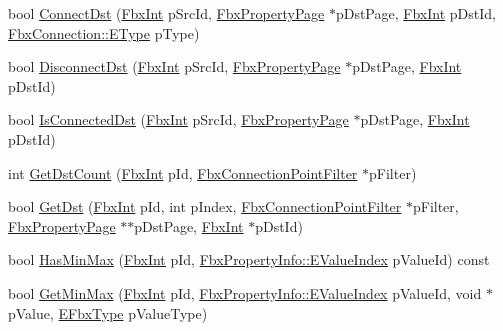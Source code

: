 \begin{DoxyCompactItemize}
\item 
bool \hyperlink{class_fbx_property_page_a5ca4dcb646f9d547db779965dca6bd65}{Connect\+Dst} (\hyperlink{fbxtypes_8h_a088fa96de3b0b3ea69f0f6afef525dfb}{Fbx\+Int} p\+Src\+Id, \hyperlink{class_fbx_property_page}{Fbx\+Property\+Page} $\ast$p\+Dst\+Page, \hyperlink{fbxtypes_8h_a088fa96de3b0b3ea69f0f6afef525dfb}{Fbx\+Int} p\+Dst\+Id, \hyperlink{class_fbx_connection_a3df448a5db356652ab99fd2be2553749}{Fbx\+Connection\+::\+E\+Type} p\+Type)
\item 
bool \hyperlink{class_fbx_property_page_a1954d1f34ba38a2a4bbc208650206e22}{Disconnect\+Dst} (\hyperlink{fbxtypes_8h_a088fa96de3b0b3ea69f0f6afef525dfb}{Fbx\+Int} p\+Src\+Id, \hyperlink{class_fbx_property_page}{Fbx\+Property\+Page} $\ast$p\+Dst\+Page, \hyperlink{fbxtypes_8h_a088fa96de3b0b3ea69f0f6afef525dfb}{Fbx\+Int} p\+Dst\+Id)
\item 
bool \hyperlink{class_fbx_property_page_ac637ff1244d34adf55fe0cc16eab4085}{Is\+Connected\+Dst} (\hyperlink{fbxtypes_8h_a088fa96de3b0b3ea69f0f6afef525dfb}{Fbx\+Int} p\+Src\+Id, \hyperlink{class_fbx_property_page}{Fbx\+Property\+Page} $\ast$p\+Dst\+Page, \hyperlink{fbxtypes_8h_a088fa96de3b0b3ea69f0f6afef525dfb}{Fbx\+Int} p\+Dst\+Id)
\item 
int \hyperlink{class_fbx_property_page_ac6960f9f9a4d0e29f33d4f338484500a}{Get\+Dst\+Count} (\hyperlink{fbxtypes_8h_a088fa96de3b0b3ea69f0f6afef525dfb}{Fbx\+Int} p\+Id, \hyperlink{class_fbx_connection_point_filter}{Fbx\+Connection\+Point\+Filter} $\ast$p\+Filter)
\item 
bool \hyperlink{class_fbx_property_page_af13a1f816102911f882837c77caa4d38}{Get\+Dst} (\hyperlink{fbxtypes_8h_a088fa96de3b0b3ea69f0f6afef525dfb}{Fbx\+Int} p\+Id, int p\+Index, \hyperlink{class_fbx_connection_point_filter}{Fbx\+Connection\+Point\+Filter} $\ast$p\+Filter, \hyperlink{class_fbx_property_page}{Fbx\+Property\+Page} $\ast$$\ast$p\+Dst\+Page, \hyperlink{fbxtypes_8h_a088fa96de3b0b3ea69f0f6afef525dfb}{Fbx\+Int} $\ast$p\+Dst\+Id)
\item 
bool \hyperlink{class_fbx_property_page_a3d7bbffaca7c15324947766e62f6f6ba}{Has\+Min\+Max} (\hyperlink{fbxtypes_8h_a088fa96de3b0b3ea69f0f6afef525dfb}{Fbx\+Int} p\+Id, \hyperlink{class_fbx_property_info_a83069f079a29bde133f2e9324de5af43}{Fbx\+Property\+Info\+::\+E\+Value\+Index} p\+Value\+Id) const
\item 
bool \hyperlink{class_fbx_property_page_a2ce4497431b32ffc1a411c10e65f3547}{Get\+Min\+Max} (\hyperlink{fbxtypes_8h_a088fa96de3b0b3ea69f0f6afef525dfb}{Fbx\+Int} p\+Id, \hyperlink{class_fbx_property_info_a83069f079a29bde133f2e9324de5af43}{Fbx\+Property\+Info\+::\+E\+Value\+Index} p\+Value\+Id, void $\ast$p\+Value, \hyperlink{fbxpropertytypes_8h_a73913a5ddfb20e57c6f25e9e6784bd92}{E\+Fbx\+Type} p\+Value\+Type)
$$
\end{DoxyCompactItemize}
